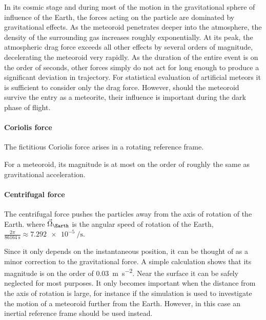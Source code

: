             In its cosmic stage and during most of the motion in the gravitational sphere of influence of the Earth,
            the forces acting on the particle are dominated by gravitational effects. As the meteoroid penetrates
            deeper into the atmosphere, the density of the surrounding gas increases roughly exponentially.
            At its peak, the atmospheric drag force exceeds all other effects by several orders of magnitude,
            decelerating the meteoroid very rapidly.
            As the duration of the entire event is on the order of seconds, other forces simply do not act for long enough
            to produce a significant deviation in trajectory. For statistical evaluation of artificial meteors
            it is sufficient to consider only the drag force.
            However, should the meteoroid survive the entry as a meteorite, their influence is important during the dark phase of flight.

            \paragraph{Coriolis force} \label{saiC}
                The fictitious Coriolis force arises in a rotating reference frame.

                For a meteoroid, its magnitude is at most on the order of
                roughly the same as gravitational acceleration.

            \paragraph{Centrifugal force} \label{saic}
                The centrifugal force pushes the particles away from the axis of rotation of the Earth.
                where $\vec{\Omega}_\Earth$ is the angular speed of rotation of the Earth,
                $\frac{2\pi}{\SI{86164}{\second}} \approx \SI{7.292e-5}{\per\second}$.

                Since it only depends on the instantaneous position, it can be thought of as a minor correction to the
                gravitational force. A simple calculation shows that its magnitude is on the order
                of \SI{0.03}{\metre\per\second\squared}. Near the surface it can be safely neglected for most purposes.
                It only becomes important when the distance from the axis of rotation is large, for instance if the simulation
                is used to investigate the motion of a meteoroid further from the Earth.
                However, in this case an inertial reference frame should be used instead.

